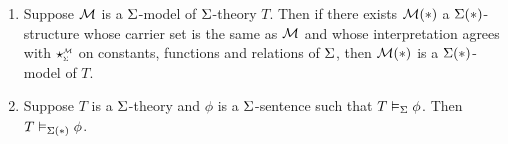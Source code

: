 \begin{prop} 
    \begin{enumerate}
        Suppose $\Si \leq \Si(*)$.
        \item Suppose $\mathcal{M}$ is a $\Sigma$-model of $\Sigma$-theory $T$.
            Then if there exists $\mathcal{M}(*)$ a $\Sigma(*)$-structure 
            whose carrier set is the same as $\mathcal{M}$
            and whose interpretation agrees with $\intp{\Si}{\MM}$ 
            on constants, functions and relations of $\Sigma$,
            then $\mathcal{M}(*)$ is a $\Sigma(*)$-model of $T$.

        \item Suppose $T$ is a $\Sigma$-theory and $\phi$ is a 
            $\Sigma$-sentence such that $T \vDash_{\Sigma} \phi$.
            Then $T \vDash_{\Sigma(*)} \phi$.
    \end{enumerate}
\end{prop}

